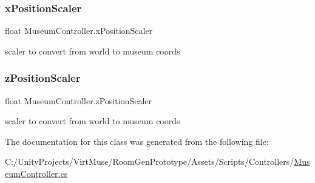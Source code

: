 \subsubsection{\texorpdfstring{x\+Position\+Scaler}{xPositionScaler}}
{\footnotesize\ttfamily float Museum\+Controller.\+x\+Position\+Scaler\hspace{0.3cm}{\ttfamily [private]}}



scaler to convert from world to museum coords 

\mbox{\label{class_museum_controller_a8d52c606f74d7363018bd4a291b010ec}} 
\subsubsection{\texorpdfstring{z\+Position\+Scaler}{zPositionScaler}}
{\footnotesize\ttfamily float Museum\+Controller.\+z\+Position\+Scaler\hspace{0.3cm}{\ttfamily [private]}}



scaler to convert from world to museum coords 



The documentation for this class was generated from the following file\+:\begin{DoxyCompactItemize}
\item 
C\+:/\+Unity\+Projects/\+Virt\+Muse/\+Room\+Gen\+Prototype/\+Assets/\+Scripts/\+Controllers/\mbox{\hyperlink{_museum_controller_8cs}{Museum\+Controller.\+cs}}\end{DoxyCompactItemize}
